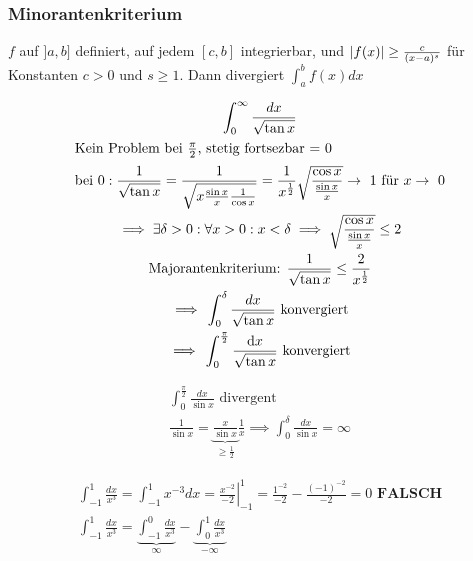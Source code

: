 \subsubsection{Minorantenkriterium}
$f$ auf $]a,b]$ definiert, auf jedem $[c,b]$ integrierbar, und $\abs{f(x)} \geq \frac{c}{(x-a)^s}$ für Konstanten $c>0$ und $s \geq 1$. Dann divergiert $\int_a^b f(x) dx$

\begin{bsp*}
	\begin{gather*}
		\int_0^\infty \frac{dx}{\sqrt{\tan x}} \\
		\intertext{Kein Problem bei $\frac{\pi}{2}$, stetig fortsezbar = 0}
		\text{bei } 0: \frac{1}{\sqrt{\tan x}} = \frac{1}{\sqrt{x \frac{\sin x}{x} \frac{1}{\cos x}}} = \frac{1}{x^{\frac{1}{2}}} \sqrt{ \frac{\cos x}{\frac{\sin x}{x}}} \rightarrow 1 \text{ für } x \rightarrow 0 \\
		\implies \exists \delta > 0 : \forall x > 0 : x < \delta \implies \sqrt{ \frac{\cos x}{\frac{\sin x}{x}}} \leq 2 \\
		\text{Majorantenkriterium: } \frac{1}{\sqrt{\tan x}} \leq \frac{2}{x^{\frac{1}{2}}} \\
		\implies \int_0^\delta \frac{dx}{\sqrt{\tan x}} \text{ konvergiert} \\
		\implies \int_0^{\frac{\pi}{2}} \frac{\dd x}{\sqrt{\tan x}} \text{ konvergiert}
	\end{gather*}
\end{bsp*}
\begin{bsp*}
	\begin{gather*}
		\int_0^{\frac{\pi}{2}} \frac{dx}{\sin x} \text{ divergent} \\
		\frac{1}{\sin x} = \underbrace{\frac{x}{\sin x}}_{\geq \frac{1}{2}} \frac{1}{x} \implies \int_0^\delta \frac{dx}{\sin x} = \infty
	\end{gather*}
\end{bsp*}
\begin{bsp*}
	\begin{gather*}
		\int_{-1}^1 \frac{dx}{x^3} = \int_{-1}^1 x^{-3} dx = \left. \frac{x^{-2}}{-2} \right|_{-1}^1 = \frac{1^{-2}}{-2} - \frac{(-1)^{-2}}{-2} = 0 \textbf{ FALSCH} \\
		\int_{-1}^1 \frac{dx}{x^3} = \underbrace{\int_{-1}^0 \frac{dx}{x^3}}_{\infty} - \underbrace{\int_0^1 \frac{dx}{x^3}}_{-\infty}
	\end{gather*}
\end{bsp*}

